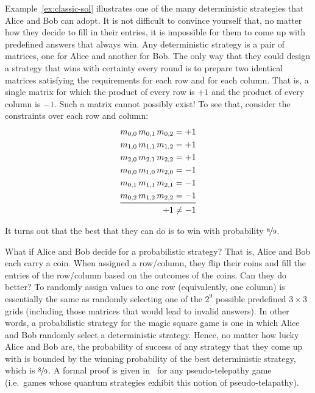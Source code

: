 \documentclass{llncs}
\begin{document}
Example~\ref{ex:classic-sol} illustrates one of the many deterministic
strategies that Alice and Bob can adopt. It is not difficult to
convince yourself that, no matter how they decide to fill in their
entries, it is impossible for them to come up with predefined answers
that always win. Any deterministic strategy is a pair of matrices, one
for Alice and another for Bob. The only way that they could design a
strategy that wins with certainty every round is to prepare two
identical matrices satisfying the requirements for each row and for
each column. That is, a single matrix for which the product of every
row is \(+1\) and the product of every column is \(-1\). Such a matrix
cannot possibly exist!  To see that, consider the constraints over
each row and column:
\[\begin{aligned}
    m_{0,0}\, m_{0,1}\, m_{0,2} &= +1 \\
    m_{1,0}\, m_{1,1}\, m_{1,2} &= +1 \\
    m_{2,0}\, m_{2,1}\, m_{2,2} &= +1 \\
    m_{0,0}\, m_{1,0}\, m_{2,0} &= -1 \\
    m_{0,1}\, m_{1,1}\, m_{2,1} &= -1 \\
    m_{0,2}\, m_{1,2}\, m_{2,2} &= -1 \\
    \midrule
    +1 &\neq -1
  \end{aligned}\]

It turns out that the best that they can do is to win
with probability \(\nicefrac{8}{9}\).

What if Alice and Bob decide for a probabilistic strategy? That is, Alice and
Bob each carry a coin. When assigned a row/column, they flip their
coins and fill the entries of the row/column based on the outcomes of
the coins. Can they do better? To randomly assign values to one row
(equivalently, one column) is essentially the same as randomly
selecting one of the \(2^{9}\) possible predefined \(3 \times 3\)
grids (including those matrices that would lead to invalid
answers). In other words, a probabilistic strategy for the magic
square game is one in which Alice and Bob randomly select a
deterministic strategy. Hence, no matter how lucky Alice and Bob are,
the probability of success of any strategy that they come up with is
bounded by the winning probability of the best deterministic strategy,
which is \(\nicefrac{8}{9}\). A formal proof is given in~\cite{brassard:2005}
for any pseudo-telepathy game (i.e.\ games whose quantum strategies
exhibit this notion of pseudo-telapathy).
\end{document}
